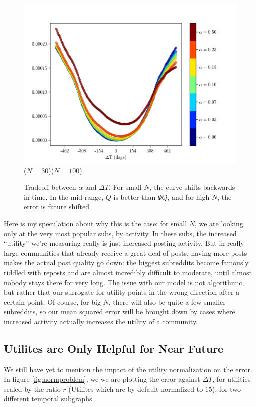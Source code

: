 \documentclass{article}
\theoremstyle{definition}
\begin{document}
\begin{figure}
		\includegraphics[height=0.32\textheight,width=0.5\linewidth]{figs/dt_vs_err/better_in_future_G1W_100.png}\\
		($N=30$)\hspace{2in}($N = 100$)
		\caption{\color{darkgray} Tradeoff between $\alpha$ and $\Delta T$. For small $N$, the curve shifts backwards in time. In the mid-range, $Q$ is better than $\Psi Q$, and for high $N$, the error is future shifted}
		\label{fig:nnodes_bias_dir}
	\end{figure}

	Here is my speculation about why this is the case: for small $N$, we are looking only at the very most popular subs, by activity. In these subs, the increased ``utility'' we're measuring really is just increased posting activity. But in really large communities that already receive a great deal of posts, having more posts makes the actual post quality go down: the biggest subreddits become famously riddled with reposts and are almost incredibly difficult to moderate, until almost nobody stays there for very long. The issue with our model is not algorithmic, but rather that our surrogate for utility points in the wrong direction after a certain point. Of course, for big $N$, there will also be quite a few smaller subreddits, so our mean squared error will be brought down by cases where increased activity actually increases the utility of a community.
	

	\subsection{Utilites are Only Helpful for Near Future}\label{sec:utilsnearfuture}
	
	We still have yet to mention the impact of the utility normalization on the error. In figure \ref{fig:normproblem}, we we are plotting the error against $\Delta T$, for utilities scaled by the ratio $r$ (Utilites which are by default normalized to 15), for two different temporal subgraphs. 
	
\end{document}
